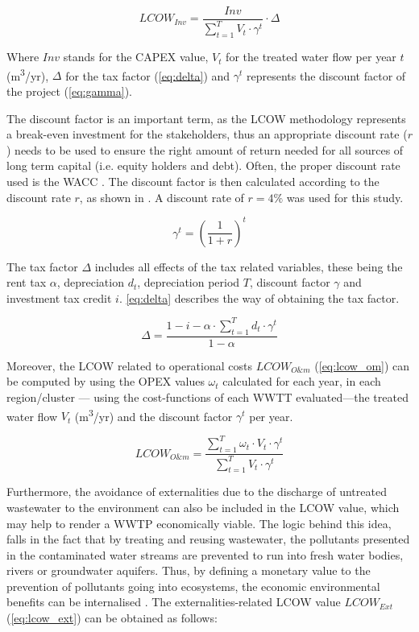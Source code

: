 \documentclass[12pt]{iopart}
\begin{document}
\begin{equation}\label{eq:lcow_inv}
LCOW_{Inv} = \frac{Inv}{\sum_{t=1}^{T} V_{t}\cdot\gamma^{t}}\cdot\Delta
\end{equation}

Where $Inv$ stands for the CAPEX value, $V_{t}$ for the treated water flow per year $t$ (m\textsuperscript{3}/yr), $\Delta$ for the tax factor (\autoref{eq:delta}) and $\gamma^{t}$ represents the discount factor of the project (\autoref{eq:gamma}).

The discount factor is an important term, as the LCOW methodology represents a break-even investment for the stakeholders, thus an appropriate discount rate ($r$) needs to be used to ensure the right amount of return needed for all sources of long term capital (i.e. equity holders and debt). Often, the proper discount rate used is the WACC \cite{prospectscostcompetitive2013}. The discount factor is then calculated according to the discount rate $r$, as shown in . A discount rate of $r=4\%$ was used for this study.

\begin{equation}\label{eq:gamma}
\gamma^{t} = \left(\frac{1}{1+r}\right)^{t}
\end{equation}

The tax factor $\Delta$ includes all effects of the tax related variables, these being the rent tax $\alpha$, depreciation $d_t$, depreciation period $T$, discount factor $\gamma$ and investment tax credit $i$. \autoref{eq:delta} describes the way of obtaining the tax factor.

\begin{equation}\label{eq:delta}
\Delta = \frac{1 - i - \alpha\cdot\sum_{t=1}^{T}d_{t}\cdot\gamma^{t}}{1 - \alpha}
\end{equation}

Moreover, the LCOW related to operational costs $LCOW_{O\&m}$ (\autoref{eq:lcow_om}) can be computed by using the OPEX values $\omega_{t}$ calculated for each year, in each region/cluster --- using the cost-functions of each WWTT evaluated---the treated water flow $V_{t}$ (m\textsuperscript{3}/yr) and the discount factor $\gamma^t$ per year.

\begin{equation}\label{eq:lcow_om}
LCOW_{O\&m} = \frac{\sum_{t=1}^{T} \omega_{t}\cdot V_{t}\cdot\gamma^{t}}{\sum_{t=1}^{T} V_{t}\cdot\gamma^{t}}
\end{equation}

Furthermore, the avoidance of externalities due to the discharge of untreated wastewater to the environment can also be included in the LCOW value, which may help to render a WWTP economically viable. The logic behind this idea, falls in the fact that by treating and reusing wastewater, the pollutants presented in the contaminated water streams are prevented to run into fresh water bodies, rivers or groundwater aquifers. Thus, by  defining a monetary value to the prevention of pollutants going into ecosystems, the economic environmental benefits can be internalised \cite{Assessmentwastewatertreatment2012}. The externalities-related LCOW value $LCOW_{Ext}$ (\autoref{eq:lcow_ext}) can be obtained as follows:
\end{document}
